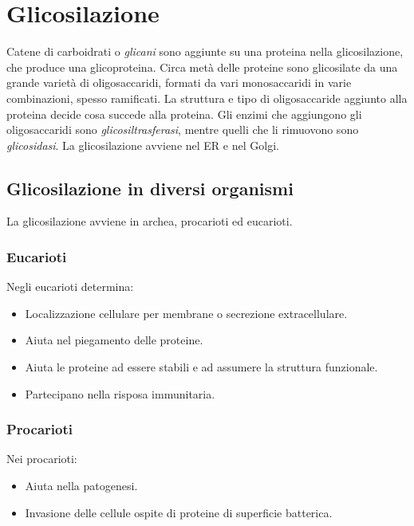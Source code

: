 \section{Glicosilazione}
Catene di carboidrati o \emph{glicani} sono aggiunte su una proteina nella glicosilazione, che produce una glicoproteina.
Circa met\`a delle proteine sono glicosilate da una grande variet\`a di oligosaccaridi, formati da vari monosaccaridi in varie combinazioni, spesso ramificati.
La struttura e tipo di oligosaccaride aggiunto alla proteina decide cosa succede alla proteina.
Gli enzimi che aggiungono gli oligosaccaridi sono \emph{glicosiltrasferasi}, mentre quelli che li rimuovono sono \emph{glicosidasi}.
La glicosilazione avviene nel ER e nel Golgi.

	\subsection{Glicosilazione in diversi organismi}
	La glicosilazione avviene in archea, procarioti ed eucarioti.
		
		\begin{multicols}{2}
			\subsubsection{Eucarioti}
			Negli eucarioti determina: 
			\begin{itemize}
				\item Localizzazione cellulare per membrane o secrezione extracellulare.
				\item Aiuta nel piegamento delle proteine.
				\item Aiuta le proteine ad essere stabili e ad assumere la struttura funzionale.
				\item Partecipano nella risposa immunitaria.
			\end{itemize}
			
			\columnbreak

			\subsubsection{Procarioti}
			Nei procarioti:
			\begin{itemize}
				\item Aiuta nella patogenesi.
				\item Invasione delle cellule ospite di proteine di superficie batterica.
			\end{itemize}
		\end{multicols}

